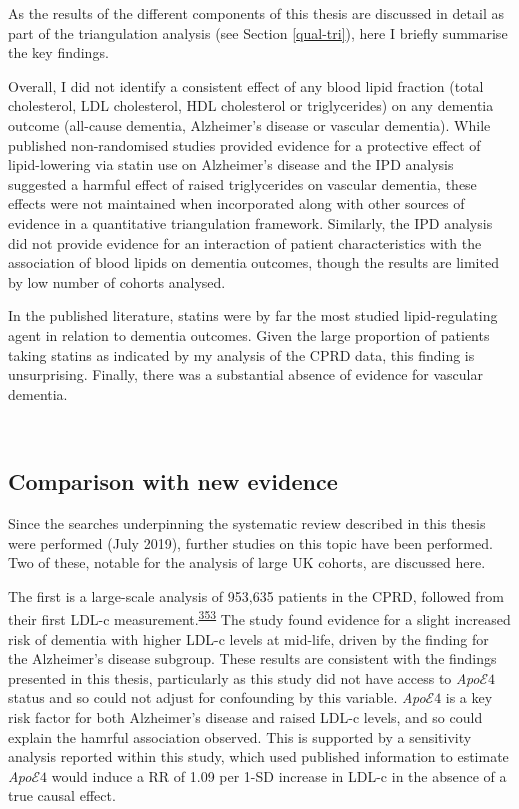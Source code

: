 \documentclass[a4paper, twoside]{templates/ociamthesis}
\begin{document}
As the results of the different components of this thesis are discussed in detail as part of the triangulation analysis (see Section \ref{qual-tri}), here I briefly summarise the key findings.

Overall, I did not identify a consistent effect of any blood lipid fraction (total cholesterol, LDL cholesterol, HDL cholesterol or triglycerides) on any dementia outcome (all-cause dementia, Alzheimer's disease or vascular dementia). While published non-randomised studies provided evidence for a protective effect of lipid-lowering via statin use on Alzheimer's disease and the IPD analysis suggested a harmful effect of raised triglycerides on vascular dementia, these effects were not maintained when incorporated along with other sources of evidence in a quantitative triangulation framework. Similarly, the IPD analysis did not provide evidence for an interaction of patient characteristics with the association of blood lipids on dementia outcomes, though the results are limited by low number of cohorts analysed.

In the published literature, statins were by far the most studied lipid-regulating agent in relation to dementia outcomes. Given the large proportion of patients taking statins as indicated by my analysis of the CPRD data, this finding is unsurprising. Finally, there was a substantial absence of evidence for vascular dementia.

~

\hypertarget{comparison-with-new-evidence}{%
\subsection{Comparison with new evidence}\label{comparison-with-new-evidence}}

Since the searches underpinning the systematic review described in this thesis were performed (July 2019), further studies on this topic have been performed. Two of these, notable for the analysis of large UK cohorts, are discussed here.

The first is a large-scale analysis of 953,635 patients in the CPRD, followed from their first LDL-c measurement.\textsuperscript{\protect\hyperlink{ref-iwagami2021}{353}} The study found evidence for a slight increased risk of dementia with higher LDL-c levels at mid-life, driven by the finding for the Alzheimer's disease subgroup. These results are consistent with the findings presented in this thesis, particularly as this study did not have access to \emph{Apo}\(\mathcal{E}4\) status and so could not adjust for confounding by this variable. \emph{Apo}\(\mathcal{E}4\) is a key risk factor for both Alzheimer's disease and raised LDL-c levels, and so could explain the hamrful association observed. This is supported by a sensitivity analysis reported within this study, which used published information to estimate \emph{Apo}\(\mathcal{E}4\) would induce a RR of 1.09 per 1-SD increase in LDL-c in the absence of a true causal effect.
\end{document}
